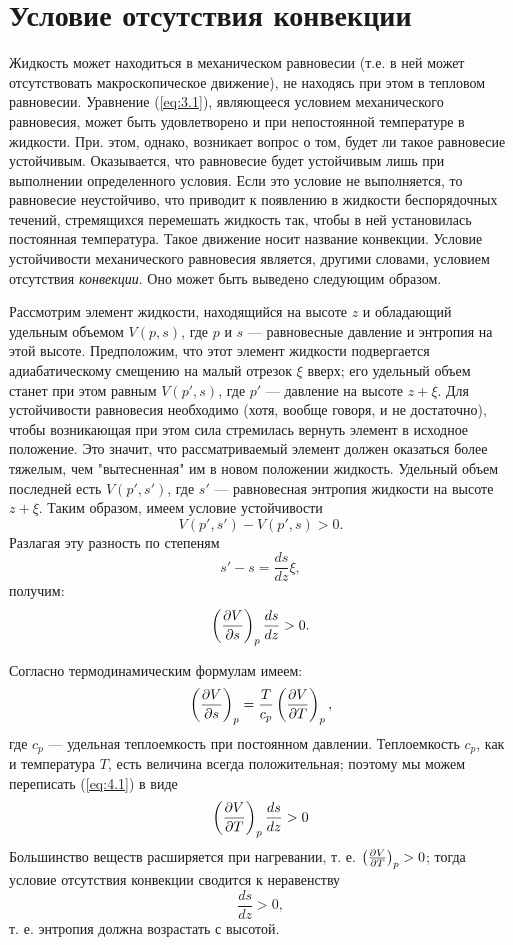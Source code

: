 \section{Условие отсутствия конвекции}
\label{sec:p4}

Жидкость может находиться в механическом равновесии (т.е. в ней может
отсутствовать макроскопическое движение), не находясь при этом в тепловом
равновесии. Уравнение (\ref{eq:3.1}), являющееся условием механического равновесия, может
быть удовлетворено и при непостоянной температуре в жидкости. При. этом, однако,
возникает вопрос о том, будет ли такое равновесие устойчивым. Оказывается, что
равновесие будет устойчивым лишь при выполнении определенного условия. Если это
условие не выполняется, то равновесие неустойчиво, что приводит к появлению в
жидкости беспорядочных течений, стремящихся перемешать жидкость так, чтобы в ней
установилась постоянная температура. Такое движение носит название конвекции.
Условие устойчивости механического равновесия является, другими словами,
условием отсутствия \textit{конвекции}. Оно может быть выведено следующим
образом.

Рассмотрим элемент жидкости, находящийся на высоте $z$ и обладающий удельным
объемом $V(p,s)$, где $p$ и $s$ — равновесные давление и энтропия на этой
высоте. Предположим, что этот элемент жидкости подвергается адиабатическому
смещению на малый отрезок $\xi$ вверх; его удельный объем станет при этом равным
$V(p',s)$, где $p'$ — давление на высоте $z+\xi$. Для устойчивости равновесия
необходимо (хотя, вообще говоря, и не достаточно), чтобы возникающая при этом
сила стремилась вернуть элемент в исходное положение. Это значит, что
рассматриваемый элемент должен оказаться более тяжелым, чем "вытесненная" им в
новом положении жидкость. Удельный объем последней есть $V(p',s')$, где $s'$ —
равновесная энтропия жидкости на высоте $z+\xi$. Таким образом, имеем условие
устойчивости
\[
   V(p',s') - V(p',s) > 0.
\]
Разлагая эту разность по степеням
\[
   s' - s = \frac{ds}{dz}\xi,
\]
получим:
\begin{equation}
   \label{eq:4.1}
   \left( \frac{\partial{V}}{\partial{s}} \right)_{p}\frac{ds}{dz} > 0.
\end{equation}

Согласно термодинамическим формулам имеем:
\[
   \left( \frac{\partial{V}}{\partial{s}} \right)_{p} = \frac{T}{c_p}\left( \frac{\partial{V}}{\partial{T}} \right)_{p},
\]
где $c_p$ — удельная теплоемкость при постоянном давлении. Теплоемкость $c_p$,
как и температура $T$, есть величина всегда положительная; поэтому мы можем
переписать (\ref{eq:4.1}) в виде
\begin{equation}
   \label{eq:4.2}
   \left( \frac{\partial{V}}{\partial{T}} \right)_{p}\frac{ds}{dz} > 0
\end{equation}
Большинство веществ расширяется при нагревании, т. е. $\left( \frac{\partial{V}}{\partial{T}} \right)_{p}>0$; тогда
условие отсутствия конвекции сводится к неравенству
\begin{equation}
   \label{eq:4.3}
   \frac{ds}{dz} > 0,
\end{equation}
т. е. энтропия должна возрастать с высотой.

